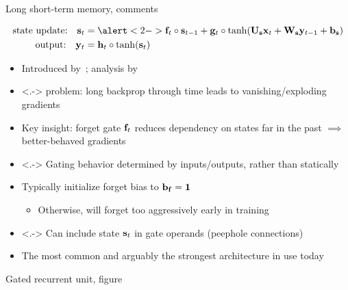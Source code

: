 \begin{frame}{Long short-term memory, comments}
    \begin{block}{}
        \vspace{-5mm}
        \begin{align*}
            \text{state update:} \quad \s_t &= \alert<2->{\f_t} \circ \s_{t-1} + \g_t \circ \tanh(\U_\s \x_t + \W_\s \y_{t-1} + \b_\s) \\
            \text{output:} \quad \y_t &= \h_t \circ \tanh(\s_t)
        \end{align*}
    \end{block}

    \begin{itemize}
        \item<+-> Introduced by~\citet{HochreiterNC97}; analysis by \citet{GreffIEEENNLS17}
        \item<.-> \rnn{} problem: long backprop through time leads to vanishing/exploding gradients
        \item<+-> Key insight: \alert{forget gate $\mathbf{f}_t$} reduces dependency on states far in the past $\implies$ better-behaved gradients
        \item<.-> Gating behavior determined by inputs/outputs, rather than statically
        \item<+-> Typically initialize forget bias to $\mathbf{b}_{\mathbf{f}} = \mathbf{1}$~\citep{GersNC00,JozefowiczICML15}
        \begin{itemize}
            \item Otherwise, \lstm{} will forget too aggressively early in training
        \end{itemize}
        \item<.-> Can include state $\mathbf{s}_t$ in gate operands (peephole connections)
        \item<+-> The most common and arguably the strongest \rnn{} architecture in use today \citep{JozefowiczICML15}
    \end{itemize}
\end{frame}

\begin{frame}{Gated recurrent unit, figure}
    \begin{center}
        \vspace{-7mm}
        
        \vspace{-7mm}
    \end{center}
\end{frame}

